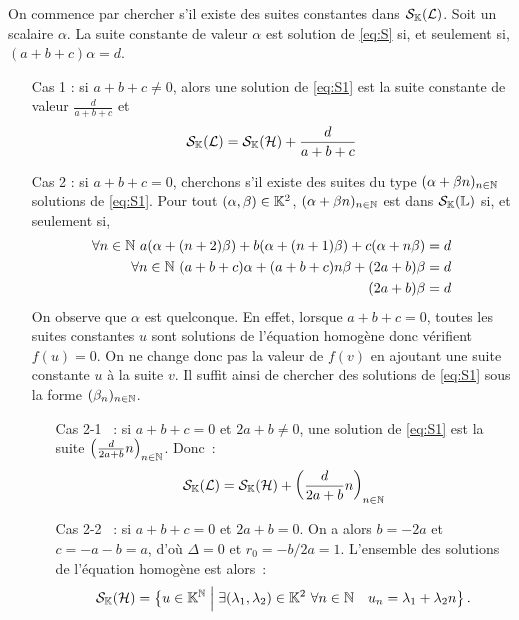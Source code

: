 On commence par chercher s'il existe des suites constantes dans \(\mathcal{S}_{\mathbb{K}}(\mathcal{L})\). Soit un scalaire \(\alpha\). La suite constante de valeur \(\alpha\) est solution de \eqref{eq:S} si, et seulement si, \((a+b+c)\alpha=d\).
\begin{itemize}
  \item[Cas 1] : si \(a+b+c \neq 0\), alors une solution de \eqref{eq:S1} est la suite constante de valeur \(\frac{d}{a+b+c}\) et
    \begin{equation}
      \mathcal{S}_{\mathbb{K}}(\mathcal{L}) = \mathcal{S}_{\mathbb{K}}(\mathcal{H}) +\frac{d}{a+b+c}
    \end{equation}
  \item[Cas 2] : si \(a+b+c=0\), cherchons s'il existe des suites du type \((\alpha+\beta n)_{n \in \mathbb{N}}\) solutions de \eqref{eq:S1}. Pour tout \((\alpha,\beta) \in \mathbb{K}^2\), \((\alpha + \beta n)_{n \in \mathbb{N}}\) est dans \(\mathcal{S}_{\mathbb{K}}(\mathbb{L})\) si, et seulement si,
    \begin{align}
      \forall n \in \mathbb{N} \ a(\alpha +(n+2)\beta)+b(\alpha+(n+1)\beta)+c(\alpha +n\beta) &=d \\
      \forall n \in \mathbb{N} \ (a+b+c)\alpha +(a+b+c)n\beta +(2a+b)\beta &=d\\
      (2a+b)\beta &=d
    \end{align}
    On observe que \(\alpha\) est quelconque. En effet, lorsque \(a+b+c=0\), toutes les suites constantes \(u\) sont solutions de l'équation homogène donc vérifient \(f(u)=0\). On ne change donc pas la valeur de \(f(v)\) en ajoutant une suite constante \(u\) à la suite \(v\). Il suffit ainsi de chercher des solutions de \eqref{eq:S1} sous la forme \((\beta_n)_{n \in \mathbb{N}}\).
    \begin{itemize}
      \item[Cas 2-1]~: si \(a+b+c=0\) et \(2a+b \neq 0\), une solution de \eqref{eq:S1} est la suite \(\left(\frac{d}{2a+b}n\right)_{n \in \mathbb{N}}\). Donc~:
        \begin{equation}
          \mathcal{S}_{\mathbb{K}}(\mathcal{L}) = \mathcal{S}_{\mathbb{K}}(\mathcal{H}) + \left(\frac{d}{2a+b}n\right)_{n \in \mathbb{N}}
        \end{equation}
      \item[Cas 2-2]~: si \(a+b+c=0\) et \(2a+b = 0\). On a alors \(b=-2a\) et \(c=-a-b=a\), d'où \(\Delta=0\) et \(r_0=-b/2a=1\). L'ensemble des solutions de l'équation homogène est alors~:
        \begin{equation}
          \mathcal{S}_{\mathbb{K}}(\mathcal{H}) = \left\{u \in \mathbb{K}^{\mathbb{N}}\mathrel{}\middle|\mathrel{}\exists (\lambda_1, \lambda_2) \in \mathbb{K}^2 \ \forall n \in \mathbb{N} \quad u_n = \lambda_1+\lambda_2 n\right\}.
        \end{equation}

\end{itemize}
\end{itemize}
